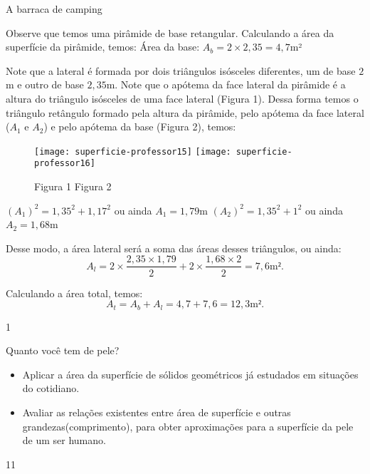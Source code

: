 \clearmargin
\marginpar{\vspace{.5em}}
\begin{answer}{A barraca de camping}
{
  Observe que temos uma pirâmide de base retangular. Calculando a área da superfície da pirâmide, temos: Área da base: $A_b=2\times2{,}35=4,7$m²

Note que a lateral é formada por dois triângulos isósceles diferentes, um de base $2$m e outro de base $2{,}35$m. Note que o apótema da face lateral da pirâmide é a altura do triângulo isósceles de uma face lateral (Figura 1). Dessa forma temos o triângulo retângulo formado pela altura da pirâmide, pelo apótema da face lateral ($A_1$  e $ A_2$) e pelo apótema da base (Figura 2), temos:

\begin{figure}[H]
\centering

\resizebox{.9\linewidth}{!}
{
  \texttt{[image: superficie-professor15]}
  \texttt{[image: superficie-professor16]}
}

\vspace{.3em}
Figura 1 \hspace{.3\linewidth} Figura 2
\end{figure}

$(A_1)^2=1{,}35^2+1{,}17^2$ ou ainda $A_1=1{,}79$m $(A_2)^2=1{,}35^2+1^2$ ou ainda $A_2=1{,}68$m 

Desse modo, a área lateral será a soma das áreas desses triângulos, ou ainda:
\begin{equation*}
A_l=2\times\frac{2{,}35\times1{,}79}{2}+2\times\frac{1{,}68\times2}{2}=7{,}6\text{m²}.
\end{equation*}

Calculando a área total, temos: 
\begin{equation*}
A_t=A_b+A_l=4{,}7+7{,}6=12{,}3\text{m²}.
\end{equation*}

}{1}
\end{answer}
\begin{objectives}{Quanto você tem de pele?}
{
\begin{itemize}
\item Aplicar a área da superfície de sólidos geométricos já estudados em situações do cotidiano.
\item Avaliar as relações existentes entre área de superfície e outras grandezas(comprimento), para obter aproximações para a superfície da pele de um ser humano.
\end{itemize}
}{1}{1}
\end{objectives}
